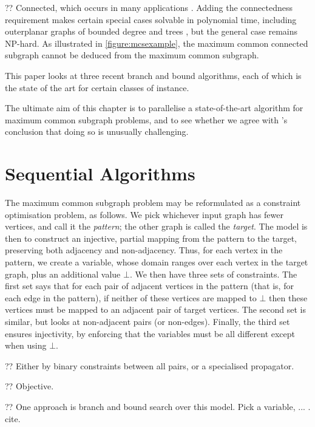 \documentclass[sigconf]{acmart}
\newcommand{\citepos}[1]{\citet{#1}'s}
\begin{document}
?? Connected, which occurs in many applications
\citep{DBLP:journals/tcs/Koch01,DBLP:journals/jcamd/RaymondW02a,DBLP:conf/mco/VismaraV08,o:EhrlichR11,o:LuoWSN17}.
Adding the connectedness requirement makes certain special cases solvable in polynomial time,
including outerplanar graphs of bounded degree \citep{DBLP:journals/algorithms/AkutsuT13} and trees
\citep{DBLP:conf/mfcs/DroschinskyKM16}, but the general case remains NP-hard. As illustrated in
\cref{figure:mcsexample}, the maximum common connected subgraph cannot be deduced from the maximum
common subgraph.

This paper looks at three recent branch and bound algorithms, each of which is the state of the art
for certain classes of instance.

The ultimate aim of this chapter is to parallelise a state-of-the-art algorithm for maximum common
subgraph problems, and to see whether we agree with \citepos{DBLP:conf/ictai/MinotNS15} conclusion
that doing so is unusually challenging.

\section{Sequential Algorithms}

The maximum common subgraph problem may be reformulated as a constraint optimisation problem, as
follows. We pick whichever input graph has fewer vertices, and call it the \emph{pattern}; the other
graph is called the \emph{target}. The model is then to construct an injective, partial mapping from
the pattern to the target, preserving both adjacency and non-adjacency. Thus, for each
vertex in the pattern, we create a variable, whose domain ranges over each vertex in the target
graph, plus an additional value $\bot$. We then have three sets of constraints. The first set says
that for each pair of adjacent vertices in the pattern (that is, for each edge in the pattern),
if neither of these vertices are mapped to $\bot$ then these vertices must be mapped to an adjacent
pair of target vertices. The second set is similar, but looks at non-adjacent pairs (or non-edges).
Finally, the third set ensures injectivity, by enforcing that the variables must be all different
except when using $\bot$.

?? Either by binary constraints between all pairs, or a specialised propagator.

?? Objective.

?? One approach is branch and bound search over this model. Pick a variable, ... . cite.
\end{document}
